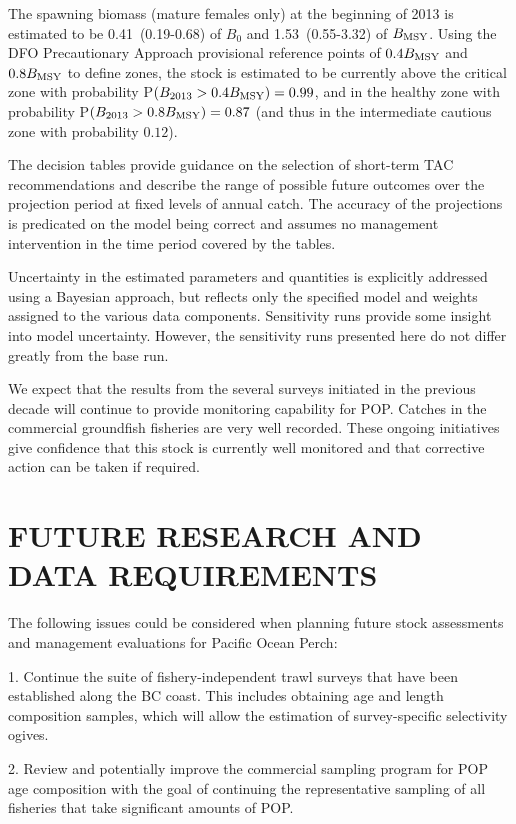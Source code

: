 The spawning biomass (mature females only) at the beginning of 2013 is estimated to be 0.41~(0.19-0.68) of $B_0$ and 1.53~(0.55-3.32) of $B_\mathrm{MSY}$. Using the DFO Precautionary Approach provisional reference points of $0.4 B_\mathrm{MSY}$ and $0.8 B_\mathrm{MSY}$ to define zones, the stock is estimated to be currently above the critical zone with probability P$(B_{2013} > 0.4 B_\mathrm{MSY}) = 0.99$, and in the healthy zone with probability P$(B_{2013} > 0.8 B_\mathrm{MSY}) = 0.87$ (and thus in the intermediate cautious zone with probability $0.12$).


The decision tables provide guidance on the selection of short-term TAC recommendations and describe the range of possible future outcomes over the projection period at fixed levels of annual catch. The accuracy of the projections is predicated on the model being correct and assumes no management intervention in the time period covered by the tables.

Uncertainty in the estimated parameters and quantities is explicitly addressed using a Bayesian approach, but reflects only the specified model and weights assigned to the various data components.  Sensitivity runs provide some insight into model uncertainty.  However, the sensitivity runs presented here do not differ greatly from the base run.

We expect that the results from the several surveys initiated in the previous decade will continue to provide monitoring capability for POP. Catches in the commercial groundfish fisheries are very well recorded. These ongoing initiatives give confidence that this stock is currently well monitored and that corrective action can be taken if required.


\section{FUTURE RESEARCH AND DATA REQUIREMENTS}

The following issues could be considered when planning future stock assessments and management evaluations for Pacific Ocean Perch:

1. Continue the suite of fishery-independent trawl surveys that have been established along the BC coast. This includes obtaining age and length composition samples, which will allow the estimation of survey-specific selectivity ogives.

2. Review and potentially improve the commercial sampling program for POP age composition with the goal of continuing the representative sampling of all fisheries that take significant amounts of POP.

